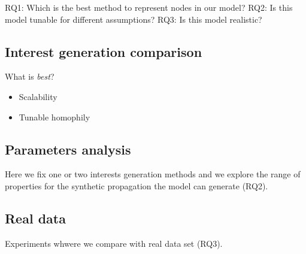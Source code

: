 
RQ1: Which is the best method to represent nodes in our model?
RQ2: Is this model tunable for different assumptions?
RQ3: Is this model realistic?

\subsection{Interest generation comparison}

What is \emph{best}?

\begin{itemize}
  \item Scalability
  \item Tunable homophily
\end{itemize}


\subsection{Parameters analysis}

Here we fix one or two interests generation methods and we explore the range of properties for the synthetic propagation the model can generate (RQ2).





\subsection{Real data}

Experiments whwere we compare with real data set (RQ3).

